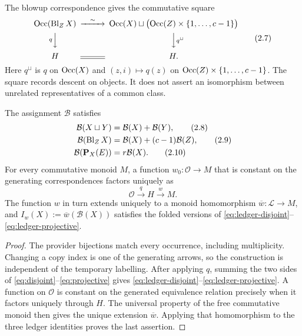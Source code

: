 The blowup correspondence gives the commutative square
\begin{equation}
\begin{CD}
 \Occ(\Bl_ZX) @>{\sim}>>
 \Occ(X)\sqcup\bigl(\Occ(Z)\times\{1,\ldots,c-1\}\bigr)\\
 @V{q}VV @VV{q^{\sqcup}}V\\
 H @= H .
\end{CD}
\tag{2.7}\label{diag:occurrence-descent}
\end{equation}
Here $q^{\sqcup}$ is $q$ on $\operatorname{Occ}(X)$ and $(z,i)\mapsto q(z)$ on
$\operatorname{Occ}(Z)\times\{1,\ldots,c-1\}$.  The square records descent on objects.  It
does not assert an isomorphism between
unrelated representatives of a common class.

\begin{theorem}
\label{thm:ledger}
The assignment \(\mathcal B\) satisfies
\begin{align}
 \mathcal B(X\sqcup Y)&=\mathcal B(X)+\mathcal B(Y),
                                                        \tag{2.8}\label{eq:ledger-disjoint}\\
 \mathcal B(\operatorname{Bl}_ZX)&=\mathcal B(X)+(c-1)\mathcal B(Z),
                                                        \tag{2.9}\label{eq:ledger-blowup}\\
 \mathcal B(\mathbf P_X(E))&=r\mathcal B(X).                 \tag{2.10}\label{eq:ledger-projective}
\end{align}
For every commutative monoid $M$, a function $w_0:\mathscr O\to M$ that
is constant on the generating correspondences factors uniquely as
\[
 \mathscr O\xrightarrow{q}H\xrightarrow{w}M.
\]
The function $w$ in turn extends uniquely to a monoid homomorphism
\(\overline w:\mathcal L\to M\), and
\(I_w(X):=\overline w(\mathcal B(X))\) satisfies the folded versions of
\eqref{eq:ledger-disjoint}--\eqref{eq:ledger-projective}.
\end{theorem}

\begin{proof}
The provider bijections match every occurrence, including multiplicity.
Changing a copy index is one of the generating arrows, so the construction is
independent of the temporary labelling.  After applying $q$, summing the two sides of
\eqref{eq:disjoint}--\eqref{eq:projective} gives
\eqref{eq:ledger-disjoint}--\eqref{eq:ledger-projective}.  A function on
\(\mathscr O\) is constant on the generated equivalence relation precisely
when it factors uniquely through $H$.  The universal property of the free
commutative monoid then gives the unique extension \(\overline w\).  Applying
that homomorphism to the three ledger identities proves the last assertion.
\end{proof}

